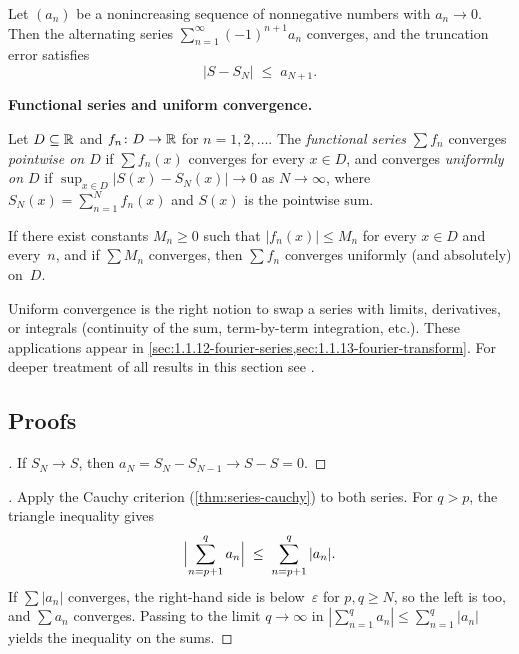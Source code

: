 \begin{theorem}
\label{thm:leibniz}
Let $(a_n)$ be a nonincreasing sequence of nonnegative numbers with
$a_n \to 0$. Then the alternating series
$\sum_{n=1}^{\infty} (-1)^{n+1} a_n$ converges, and the truncation
error satisfies
\[
  |S - S_N| \;\le\; a_{N+1}.
\]
\end{theorem}

\medskip

\noindent\textbf{Functional series and uniform convergence.}

\begin{definition}
\label{def:functional-series}
Let $D \subseteq \mathbb{R}$ and $f_n \colon D \to \mathbb{R}$ for $n = 1, 2, \dots$.
The \emph{functional series} $\sum f_n$ converges \emph{pointwise on
$D$} if $\sum f_n(x)$ converges for every $x \in D$, and converges
\emph{uniformly on $D$} if
$\sup_{x \in D} \bigl|S(x) - S_N(x)\bigr| \to 0$ as $N \to \infty$,
where $S_N(x) = \sum_{n=1}^{N} f_n(x)$ and $S(x)$ is the pointwise
sum.
\end{definition}

\begin{theorem}
\label{thm:weierstrass-m}
If there exist constants $M_n \ge 0$ such that $|f_n(x)| \le M_n$ for
every $x \in D$ and every~$n$, and if $\sum M_n$ converges, then
$\sum f_n$ converges uniformly (and absolutely) on~$D$.
\end{theorem}

\begin{remark}
Uniform convergence is the right notion to swap a series with limits,
derivatives, or integrals (continuity of the sum, term-by-term
integration, etc.). These applications appear in
\cref{sec:1.1.12-fourier-series,sec:1.1.13-fourier-transform}. For
deeper treatment of all results in this section see \cite{Zorich1981}.
\end{remark}

\subsection*{Proofs}

\begin{proof}[]
If $S_N \to S$, then $a_N = S_N - S_{N-1} \to S - S = 0$.
\end{proof}

\begin{proof}[]
Apply the Cauchy criterion (\cref{thm:series-cauchy}) to both series.
For $q > p$, the triangle inequality gives
\[
  \Bigl| \sum_{n=p+1}^{q} a_n \Bigr| \;\le\; \sum_{n=p+1}^{q} |a_n|.
\]
If $\sum |a_n|$ converges, the right-hand side is below~$\varepsilon$
for $p, q \ge N$, so the left is too, and $\sum a_n$ converges.
Passing to the limit $q \to \infty$ in
$|\sum_{n=1}^{q} a_n| \le \sum_{n=1}^{q} |a_n|$ yields the
inequality on the sums.
\end{proof}

